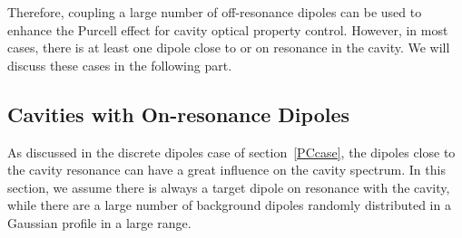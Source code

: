 


Therefore, coupling a large number of off-resonance dipoles can be used to enhance the Purcell effect for cavity optical property control. However, in most cases, there is at least one dipole close to or on resonance in the cavity. We will discuss these cases in the following part.


\subsection{Cavities with On-resonance Dipoles}
As discussed in the discrete dipoles case of section~\ref{PCcase}, the dipoles close to the cavity resonance can have a great influence on the cavity spectrum. In this section, we assume there is always a target dipole on resonance with the cavity, while there are a large number of background dipoles randomly distributed in a Gaussian profile in a large range.


